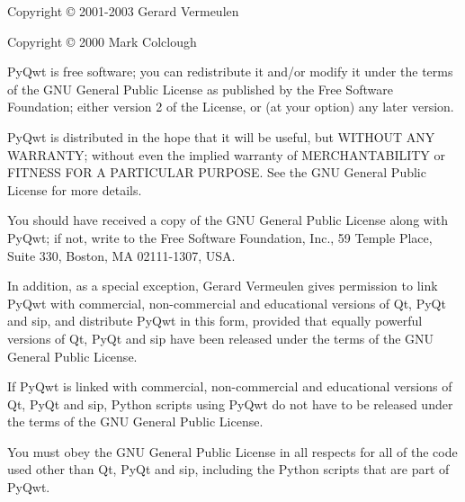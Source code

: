 Copyright \copyright{} 2001-2003 Gerard Vermeulen

Copyright \copyright{} 2000 Mark Colclough

PyQwt is free software; you can redistribute it and/or modify it under the
terms of the GNU General Public License as published by the Free Software
Foundation; either version 2 of the License, or (at your option) any later
version.

PyQwt is distributed in the hope that it will be useful, but WITHOUT ANY
WARRANTY; without even the implied warranty of MERCHANTABILITY or FITNESS
FOR A PARTICULAR PURPOSE.  See the GNU  General Public License for more
details.

You should have received a copy of the GNU General Public License along with
PyQwt; if not, write to the Free Software Foundation, Inc., 59 Temple Place,
Suite 330, Boston, MA 02111-1307, USA.

In addition, as a special exception, Gerard Vermeulen gives permission to
link PyQwt with commercial, non-commercial and educational versions of Qt,
PyQt and sip, and distribute PyQwt in this form, provided that equally
powerful versions of Qt, PyQt and sip have been released under the terms
of the GNU General Public License.

If PyQwt is linked with commercial, non-commercial and educational versions
of Qt, PyQt and sip, Python scripts using PyQwt do not have to be released
under the terms of the GNU General Public License. 

You must obey the GNU General Public License in all respects for all of the
code used other than Qt, PyQt and sip, including the Python scripts that are
part of PyQwt.
